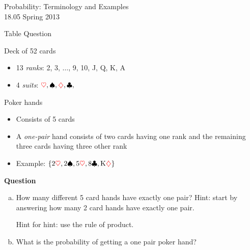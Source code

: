 

\def\myat{\makeatletter@\makeatother}
\def\myheart{{\color{red} \heartsuit}}
\def\mydiamond{{\color{red} \diamondsuit}}

\date{February 7, 2013}
\author{18.05 Class 2}






\begin{frame}[plain]
\begin{center} 
\Large \color{blue} Probability: Terminology and Examples\\
18.05 Spring 2013
\end{center}
\end{frame}


\begin{frame}{Table Question}

Deck of 52 cards
\begin{itemize}
\item 13 \emph{ranks}: 2, 3, $\dots$, 9, 10, J, Q, K, A
\item  4 \emph{suits}: $\myheart,  \spadesuit, \mydiamond, \clubsuit,$
\end{itemize}

Poker hands
\begin{itemize}
\item Consists of 5 cards
\item A {\em one-pair} hand consists of two cards having one rank and the remaining three cards having three other rank
\item Example: $\{2 \myheart, 2 \spadesuit, 5 \myheart, 8 \clubsuit, \text{K} \mydiamond\}$ 

\end{itemize}

\medskip

\textbf{Question}
\begin{enumerate}[a)]
\item How many different 5 card hands have exactly one pair?
\smallskip
Hint: start by answering how many 2 card hands have exactly one pair.

Hint for hint: use the rule of product.\\
\item What is the probability of getting a one pair poker hand?
\end{enumerate}
\end{frame}

